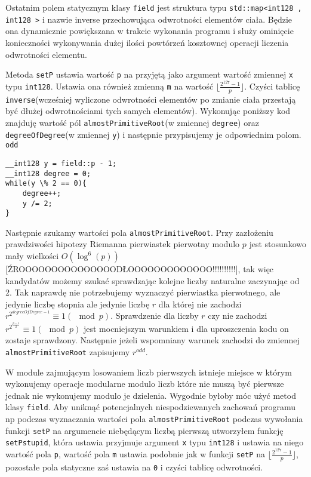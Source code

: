 \documentclass{article}
\begin{document}
Ostatnim polem statycznym klasy \texttt{field} jest struktura typu 
\texttt{std::map<\textunderscore \textunderscore int128 , \textunderscore \textunderscore int128 >} i nazwie 
inverse przechowująca odwrotności elementów ciała. Będzie ona dynamicznie powiększana w trakcie wykonania 
programu i służy ominięcie konieczności wykonywania dużej ilości powtórzeń kosztownej operacji liczenia odwrotności
elementu. 



Metoda \texttt{setP} ustawia wartość
\texttt{p} na przyjętą jako argument wartość zmiennej \texttt{x} typu 
\texttt{\textunderscore \textunderscore int128}. 
Ustawia ona również zmienną \texttt{m} na wartość $\lfloor \frac{2^{127}-1}{p} \rfloor$.
Czyści tablicę \texttt{inverse}(wcześniej wyliczone odwrotności elementów
po zmianie ciała przestają być dłużej odwrotnościami tych samych elementów).
Wykonując poniższy kod znajduję wartość pól \texttt{almostPrimitiveRoot}(w zmiennej \texttt{degree}) oraz 
\texttt{degreeOfDegree}(w zmiennej \texttt{y}) i następnie przypisujemy je odpowiednim polom.
\texttt{odd}
\begin{lstlisting}
__int128 y = field::p - 1;
__int128 degree = 0;
while(y \% 2 == 0){
    degree++;
    y /= 2;
}
\end{lstlisting} 

Następnie szukamy wartości pola \texttt{almostPrimitiveRoot}. 
Przy zazłożeniu prawdziwości hipotezy Riemanna pierwiastek pierwotny modulo $p$ jest
stosunkowo mały wielkości $O(\log^6(p))$ [ŹROOOOOOOOOOOOOOODŁOOOOOOOOOOOOO!!!!!!!!!!], 
tak więc kandydatów możemy szukać sprawdzając kolejne liczby naturalne zaczynając od 2. 
Tak naprawdę nie potrzebujemy wyznaczyć pierwiastka pierwotnego, ale jedynie liczbę stopnia ale jedynie liczbę
$r$ dla której nie zachodzi $r^{2^{degreeOfDegree-1}} \equiv 1 (\mod p)$. Sprawdzenie dla liczby $r$ czy nie zachodzi 
$r^{2^\frac{p-1}{2}} \equiv 1 (\mod p)$ jest mocniejszym warunkiem i dla uproszczenia kodu on zostaje sprawdzony. Następnie
jeżeli wspomniany warunek zachodzi do zmiennej \texttt{almostPrimitiveRoot} zapisujemy $r^{odd}$.

W module zajmującym losowaniem liczb pierwszych istnieje miejsce w którym wykonujemy operacje modularne modulo liczb
które nie muszą być pierwsze jednak nie wykonujemy modulo je dzielenia. Wygodnie byłoby móc użyć metod klasy 
\texttt{field}. Aby uniknąć potencjalnych niespodziewanych zachowań programu np podczas wyznaczania wartości pola 
\texttt{almostPrimitiveRoot} podczas wywołania funkcji \texttt{setP} na 
argumencie niebędącym liczbą pierwszą utworzyłem funkcję \texttt{setPstupid}, która ustawia przyjmuje argument
\texttt{x} typu \texttt{\textunderscore \textunderscore int128} i ustawia na niego wartość
pola \texttt{p}, wartość pola \texttt{m} ustawia podobnie jak w funkcji \texttt{setP} na  
$\lfloor \frac{2^{127}-1}{p} \rfloor$, pozostałe pola statyczne zaś ustawia na \texttt{0} i czyści tablicę odwrotności.
\end{document}
